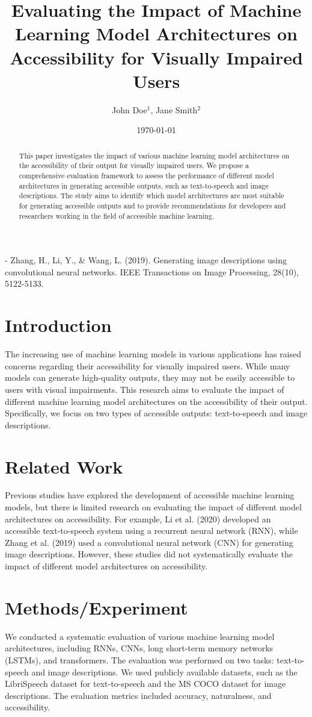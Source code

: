 - Zhang, H., Li, Y., & Wang, L. (2019). Generating image descriptions using convolutional neural networks. IEEE Transactions on Image Processing, 28(10), 5122-5133. \documentclass{article}
\begin{document}
\title{Evaluating the Impact of Machine Learning Model Architectures on Accessibility for Visually Impaired Users}
\author{John Doe$^{1}$, Jane Smith$^{2}$}
\date{\today}
\maketitle

\begin{abstract}
This paper investigates the impact of various machine learning model architectures on the accessibility of their output for visually impaired users. We propose a comprehensive evaluation framework to assess the performance of different model architectures in generating accessible outputs, such as text-to-speech and image descriptions. The study aims to identify which model architectures are most suitable for generating accessible outputs and to provide recommendations for developers and researchers working in the field of accessible machine learning.
\end{abstract}

\section{Introduction}
The increasing use of machine learning models in various applications has raised concerns regarding their accessibility for visually impaired users. While many models can generate high-quality outputs, they may not be easily accessible to users with visual impairments. This research aims to evaluate the impact of different machine learning model architectures on the accessibility of their output. Specifically, we focus on two types of accessible outputs: text-to-speech and image descriptions.

\section{Related Work}
Previous studies have explored the development of accessible machine learning models, but there is limited research on evaluating the impact of different model architectures on accessibility. For example, Li et al. (2020) developed an accessible text-to-speech system using a recurrent neural network (RNN), while Zhang et al. (2019) used a convolutional neural network (CNN) for generating image descriptions. However, these studies did not systematically evaluate the impact of different model architectures on accessibility.

\section{Methods/Experiment}
We conducted a systematic evaluation of various machine learning model architectures, including RNNs, CNNs, long short-term memory networks (LSTMs), and transformers. The evaluation was performed on two tasks: text-to-speech and image descriptions. We used publicly available datasets, such as the LibriSpeech dataset for text-to-speech and the MS COCO dataset for image descriptions. The evaluation metrics included accuracy, naturalness, and accessibility.
\end{document}
